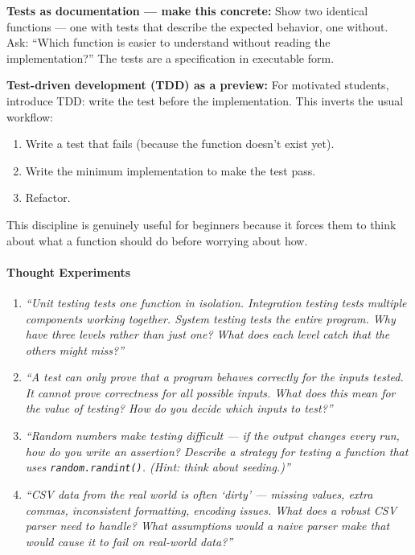 \documentclass[
  justified,
  openright,
]{tufte-book}
\let\paragraph\paragraph
\let\paragraph\paragraph
\providecommand{\tightlist}{%
  \setlength{\itemsep}{0pt}\setlength{\parskip}{0pt}}
\begin{document}
\textbf{Tests as documentation --- make this concrete:} Show two
identical functions --- one with tests that describe the expected
behavior, one without. Ask: ``Which function is easier to understand
without reading the implementation?'' The tests are a specification in
executable form.

\textbf{Test-driven development (TDD) as a preview:} For motivated
students, introduce TDD: write the test before the implementation. This
inverts the usual workflow:

\begin{enumerate}
\def\labelenumi{\arabic{enumi}.}
\tightlist
\item
  Write a test that fails (because the function doesn't exist yet).
\item
  Write the minimum implementation to make the test pass.
\item
  Refactor.
\end{enumerate}

This discipline is genuinely useful for beginners because it forces them
to think about what a function should do before worrying about how.

\paragraph{Thought Experiments}\label{thought-experiments-16}

\begin{enumerate}
\def\labelenumi{\arabic{enumi}.}
\item
  \emph{``Unit testing tests one function in isolation. Integration
  testing tests multiple components working together. System testing
  tests the entire program. Why have three levels rather than just one?
  What does each level catch that the others might miss?''}
\item
  \emph{``A test can only prove that a program behaves correctly for the
  inputs tested. It cannot prove correctness for all possible inputs.
  What does this mean for the value of testing? How do you decide which
  inputs to test?''}
\item
  \emph{``Random numbers make testing difficult --- if the output
  changes every run, how do you write an assertion? Describe a strategy
  for testing a function that uses \texttt{random.randint()}. (Hint:
  think about seeding.)''}
\item
  \emph{``CSV data from the real world is often `dirty' --- missing
  values, extra commas, inconsistent formatting, encoding issues. What
  does a robust CSV parser need to handle? What assumptions would a
  naive parser make that would cause it to fail on real-world data?''}
\end{enumerate}
\end{document}
